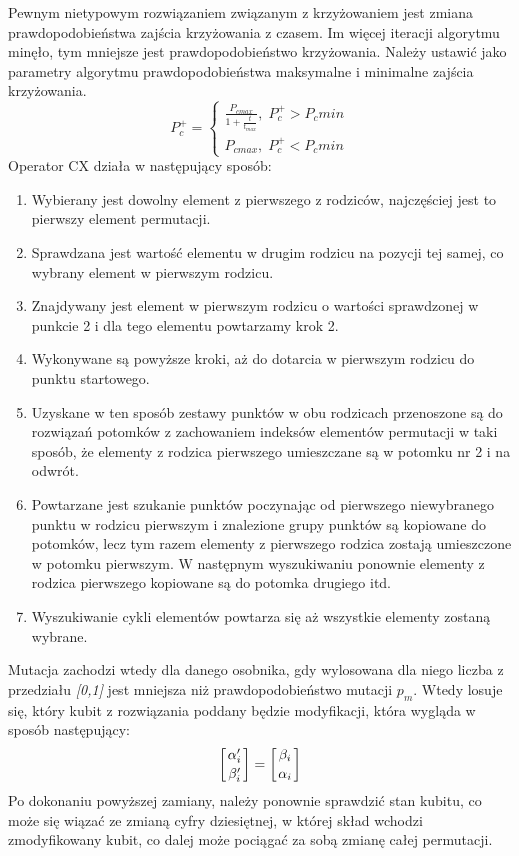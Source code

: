 Pewnym nietypowym rozwiązaniem związanym z krzyżowaniem jest zmiana prawdopodobieństwa zajścia krzyżowania z czasem. Im więcej iteracji algorytmu minęło, tym mniejsze jest prawdopodobieństwo krzyżowania. Należy ustawić jako parametry algorytmu prawdopodobieństwa maksymalne i minimalne zajścia krzyżowania.
\newline
\begin{equation}
P_c^+= \left\{ \begin{array}{ccc} \frac{P_{c max}}{1+\frac{t}{t_{max}}}, \; P_c^+ > P_c min \\ P_{c max}, \; P_c^+ < P_c min \end{array} \right.
\end{equation}
\newline
Operator CX działa w następujący sposób:
\begin{enumerate}
\item Wybierany jest dowolny element z pierwszego z rodziców, najczęściej jest to pierwszy element permutacji.
\item Sprawdzana jest wartość elementu w drugim rodzicu na pozycji tej samej, co wybrany element w pierwszym rodzicu.
\item Znajdywany jest element w pierwszym rodzicu o wartości sprawdzonej w punkcie 2 i dla tego elementu powtarzamy krok 2.
\item Wykonywane są powyższe kroki, aż do dotarcia w pierwszym rodzicu do punktu startowego.
\item Uzyskane w ten sposób zestawy punktów w obu rodzicach przenoszone są do rozwiązań potomków z zachowaniem indeksów elementów permutacji w taki sposób, że elementy z rodzica pierwszego umieszczane są w potomku nr 2 i na odwrót.
\item Powtarzane jest szukanie punktów poczynając od pierwszego niewybranego punktu w rodzicu pierwszym i znalezione grupy punktów są kopiowane do potomków, lecz tym razem elementy z pierwszego rodzica zostają umieszczone w potomku pierwszym. W następnym wyszukiwaniu ponownie elementy z rodzica pierwszego kopiowane są do potomka drugiego itd.
\item Wyszukiwanie cykli elementów powtarza się aż wszystkie elementy zostaną wybrane.
\end{enumerate}

Mutacja zachodzi wtedy dla danego osobnika, gdy wylosowana dla niego liczba z przedziału \textit{[0,1]} jest mniejsza niż prawdopodobieństwo mutacji $p_m$. Wtedy losuje się, który kubit z rozwiązania poddany będzie modyfikacji, która wygląda w sposób następujący:
\newline
\begin{equation}
\left[ {\alpha_i^\prime \atop \beta_i^\prime} \right] = \left[ {\beta_i \atop \alpha_i} \right]
\end{equation}
\newline
Po dokonaniu powyższej zamiany, należy ponownie sprawdzić stan kubitu, co może się wiązać ze zmianą cyfry dziesiętnej, w której skład wchodzi zmodyfikowany kubit, co dalej może pociągać za sobą zmianę całej permutacji.

